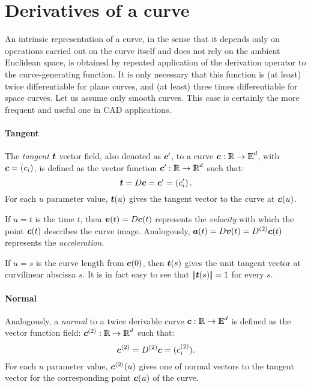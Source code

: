 \documentclass{31x47jw}
\begin{document}
\section{Derivatives of a curve}

An intrinsic representation of a curve, in the sense that it depends
only on operations carried out on the curve itself and does not rely
on the ambient Euclidean space, is obtained by repeated application of
the derivation operator to the curve-generating function.  It is only
necessary that this function is (at least) twice differentiable for plane
curves, and (at least) three times differentiable for space curves.  Let
us assume only smooth curves.  This case is certainly the
more frequent and useful one in CAD applications.


\paragraph{Tangent}

The \emph{tangent} ${\mbox{\boldmath $t$}}$ vector field, also denoted as ${\mbox{\boldmath $c$}}'$, to a
curve ${\mbox{\boldmath $c$}}:\mathbb{I\!\!R}\rightarrow{\mathbb{I\!\!E}}^{d}$, with ${\mbox{\boldmath $c$}}=(c_{i})$,
is defined as the vector function ${\mbox{\boldmath $c$}}':\mathbb{I\!\!R}\rightarrow\mathbb{I\!\!R}^{d}$
such that:
\[
{\mbox{\boldmath $t$}} = D {\mbox{\boldmath $c$}} = {\mbox{\boldmath $c$}}' = \left(
c'_{i}\right).
\]
For each $u$ parameter value, ${\mbox{\boldmath $t$}}(u)$ gives the tangent vector
to the curve at ${\mbox{\boldmath $c$}}(u)$.

If $u=t$ is the time $t$, then ${\mbox{\boldmath $v$}}(t) = D{\mbox{\boldmath $c$}}(t)$ represents the
\emph{velocity} with which the point ${\mbox{\boldmath $c$}}(t)$ describes the curve
image.  Analogously, ${\mbox{\boldmath $a$}}(t) = D{\mbox{\boldmath $v$}}(t) = D^{(2)}{\mbox{\boldmath $c$}}(t)$
represents the \emph{acceleration}.

If $u=s$ is the curve length from ${\mbox{\boldmath $c$}}(0)$, then ${\mbox{\boldmath $t$}}(s)$ gives
the unit tangent vector at curvilinear abscissa $s$.  It is in fact
easy to see that ${\left|\!\left|{\mbox{\boldmath $t$}}(s)\right|\!\right|} = 1$ for every $s$.


\paragraph{Normal}

Analogously, a \emph{normal} to a twice derivable curve
${\mbox{\boldmath $c$}}:\mathbb{I\!\!R}\rightarrow \mathbb{I\!\!E}^{d}$ is defined as the vector function field:
${\mbox{\boldmath $c$}}^{(2)}:\mathbb{I\!\!R}\rightarrow\mathbb{I\!\!R}^{d}$ such that:
\[
{\mbox{\boldmath $c$}}^{(2)} = D^{(2)} {\mbox{\boldmath $c$}} =
(c^{(2)}_{i}).
\]
For each $u$ parameter value, ${\mbox{\boldmath $c$}}^{(2)}(u)$ gives one of normal
vectors to the tangent vector for the corresponding point ${\mbox{\boldmath $c$}}(u)$
of the curve.
\end{document}
